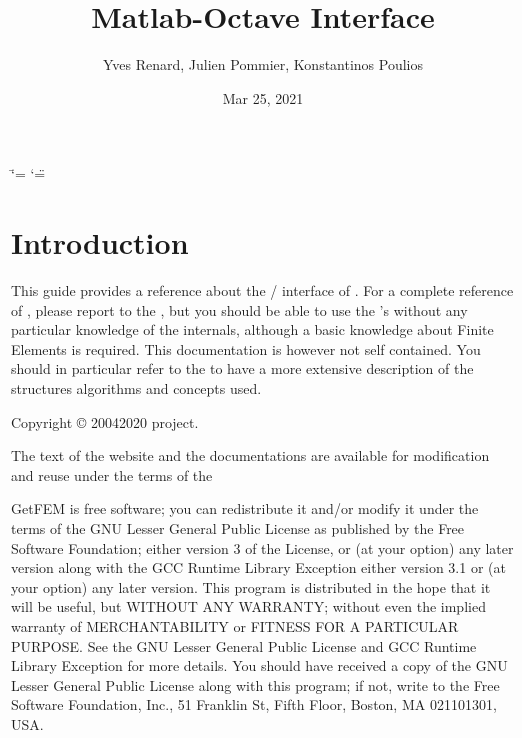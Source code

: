 \documentclass[a4paper,11pt,english]{sphinxmanual}
\title{Matlab-Octave Interface}
\date{Mar 25, 2021}
\author{Yves Renard, Julien Pommier, Konstantinos Poulios}
\begin{document}
\ifdefined\shorthandoff
  \ifnum\catcode`\=\string=\active\shorthandoff{=}\fi
  \ifnum\catcode`\"=\active{}\fi
\fi

\pagestyle{empty}
\sphinxmaketitle
\pagestyle{plain}
\sphinxtableofcontents
\pagestyle{normal}
\label{\detokenize{matlab_octave/index::doc}}



\chapter{Introduction}
\label{\detokenize{matlab_octave/intro:introduction}}\label{\detokenize{matlab_octave/intro:mlab-intro}}\label{\detokenize{matlab_octave/intro::doc}}
\sphinxAtStartPar
This guide provides a reference about the / interface of .
For a complete  reference of , please report to the ,
but you should be able to use the ’s without any particular knowledge
of the  internals, although a basic knowledge about Finite Elements
is required. This documentation is however not self contained. You should in
particular refer to the  to have a more extensive
description of the structures algorithms and concepts used.

\sphinxAtStartPar
Copyright © 2004\sphinxhyphen{}2020  project.

\sphinxAtStartPar
The text of the  website and the documentations are available for modification and reuse under the terms of the 

\sphinxAtStartPar
GetFEM  is  free software;  you  can  redistribute  it  and/or modify it
under  the  terms  of the  GNU  Lesser General Public License as published
by  the  Free Software Foundation;  either version 3 of the License,  or
(at your option) any later version along with the GCC Runtime Library
Exception either version 3.1 or (at your option) any later version.
This program  is  distributed  in  the  hope  that it will be useful,  but
WITHOUT ANY WARRANTY; without even the implied warranty of MERCHANTABILITY
or  FITNESS  FOR  A PARTICULAR PURPOSE.  See the GNU Lesser General Public
License and GCC Runtime Library Exception for more details.
You  should  have received a copy of the GNU Lesser General Public License
along  with  this program;  if not, write to the Free Software Foundation,
Inc., 51 Franklin St, Fifth Floor, Boston, MA  02110\sphinxhyphen{}1301, USA.
\end{document}
